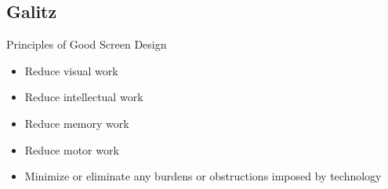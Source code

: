 \documentclass{report}
\begin{document}
\subsection*{Galitz}
Principles of Good Screen Design
\begin{itemize}
\item Reduce visual work
\item Reduce intellectual work
\item Reduce memory work
\item Reduce motor work
\item Minimize or eliminate any
burdens or obstructions
imposed by technology
\end{itemize}
\end{document}
